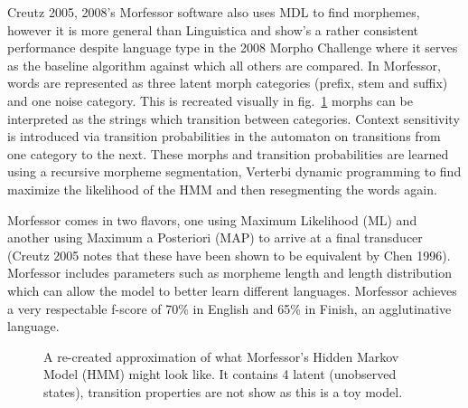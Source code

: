 \documentclass[runningheads,a4paper]{llncs}
\begin{document}
Creutz 2005, 2008's Morfessor software also uses MDL to find morphemes, however it is more general than Linguistica and show's a rather consistent performance despite language type in the 2008 Morpho Challenge where it serves as the baseline algorithm against which all others are compared. In Morfessor, words are represented as three latent morph categories (prefix, stem and suffix) and one noise category. This is recreated visually in fig.~\ref{fig:morfessor} morphs can be interpreted as the strings which transition between categories. Context sensitivity is introduced via transition probabilities in the automaton on transitions from one category to the next. These morphs and transition probabilities are learned using a recursive morpheme segmentation, Verterbi dynamic programming to find maximize the likelihood of the HMM and then resegmenting the words again. 

Morfessor comes in two flavors, one using Maximum Likelihood (ML)  and another using Maximum a Posteriori (MAP) to arrive at a final transducer (Creutz 2005 notes that these have been shown to be equivalent by Chen 1996). Morfessor includes parameters such as morpheme length and length distribution which can allow the model to better learn different languages. Morfessor achieves a very respectable f-score of 70\% in English and 65\% in Finish, an agglutinative language. 

\begin{figure}[h]
	
%
%
%
%
%
%
%
%
%
%
%
%
%
% 
%
%
%
%

	\caption{A re-created approximation of what Morfessor's Hidden Markov Model (HMM) might look like. It contains 4 latent (unobserved states), transition properties are not show as this is a toy model. }
	\label{fig:morfessor}
\end{figure}
\end{document}
